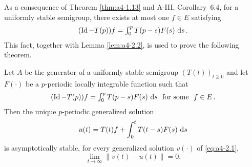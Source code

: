 
As a consequence of Theorem \ref{thm:a4-1.13}  and A-III, Corollary~6.4, for a uniformly stable semigroup, there exists at most one $f \in E$ satisfying \[\textstyle{
(\operatorname{Id}-T(p))f = \int_{0}^{p} T(p-s)F(s) \,\mathop{}\!\mathrm{d}{s}\,.
}\]
This fact, together with Lemma \ref{lem:a4-2.2}, is used to prove the following theorem.


\begin{theorem}\label{thm:a4-2.4}
Let $A$ be the generator of a uniformly stable semigroup $(T(t))_{t \geq 0}$ and let $F(\cdot)$ be a $p$-periodic locally integrable function such that \[\textstyle{
(\operatorname{Id}- T(p))f = \int_{0}^{p} T(p-s)F(s) \,\mathop{}\!\mathrm{d}{s}\ \text{ for some } \ f \in E\,.
}\]
Then the unique $p$-periodic generalized solution
\[
u(t) = T(t)f + \int_{0}^{t} T(t-s)F(s) \,\mathop{}\!\mathrm{d}{s}
\]
is asymptotically stable, \ie for every generalized solution $v(\cdot)$ of \eqref{eq:a4-2.1}, 
\[
\lim_{t \to \infty} \|v(t) - u(t)\| = 0.
\]
\end{theorem}

